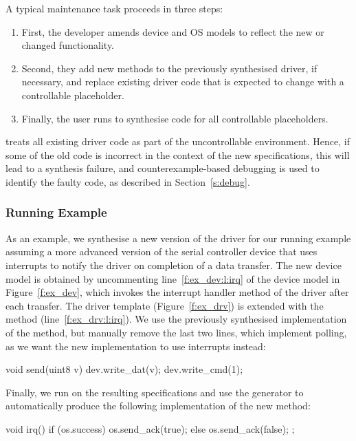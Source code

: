 A typical maintenance task proceeds in three steps:

\begin{enumerate}
    \item First, the developer amends device and OS models to reflect the new or changed functionality.  
    \item Second, they add new methods to the previously synthesised driver, if necessary, and replace existing driver code that is expected to change with a controllable  placeholder.  
    \item Finally, the user runs \termite to synthesise code for all controllable placeholders.  
\end{enumerate}
        
\termite treats all existing driver code as part of the uncontrollable environment.  Hence, if some of the old code is incorrect in the context of the new specifications, this will lead to a synthesis failure, and counterexample-based debugging is used to identify the faulty code, as described in Section~\ref{s:debug}.

\subsubsection{Running Example}

As an example, we synthesise a new version of the driver for our running example assuming a more advanced version of the serial controller device that uses interrupts to notify the driver on completion of a data transfer.  The new device model is obtained by uncommenting line~\ref{f:ex_dev:l:irq} of the device model in Figure~\ref{f:ex_dev}, which invokes the interrupt handler method of the driver after each transfer.  The driver template (Figure~\ref{f:ex_drv}) is extended with the  method (line~\ref{f:ex_drv:l:irq}).  We use the previously synthesised implementation of the  method, but manually remove the last two lines, which implement polling, as we want the new implementation to use interrupts instead:

\begin{tsllisting}
void send(uint8 v){
    dev.write_dat(v);
    dev.write_cmd(1);}
\end{tsllisting}

Finally, we run \termite on the resulting specifications and use the generator to automatically produce the following implementation of the new  method:

\begin{tsllisting}
void irq(){
    if (os.success) {
        os.send_ack(true);
    } else {
        os.send_ack(false);
    };}
\end{tsllisting}

